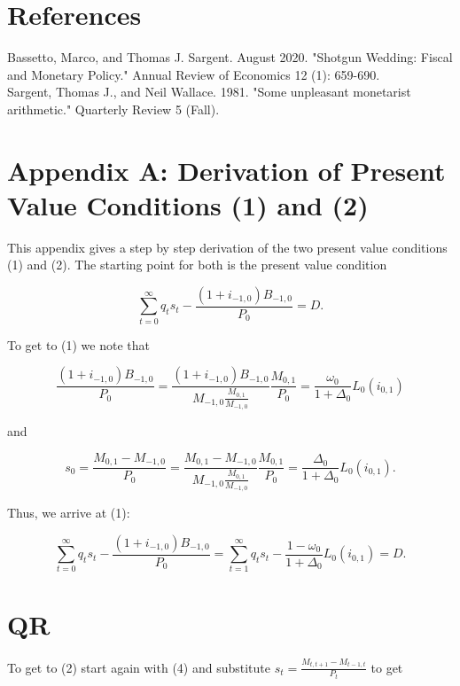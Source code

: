\documentclass[10pt]{article}
\begin{document}
\section*{References}
Bassetto, Marco, and Thomas J. Sargent. August 2020. "Shotgun Wedding: Fiscal and Monetary Policy." Annual Review of Economics 12 (1): 659-690.\\
Sargent, Thomas J., and Neil Wallace. 1981. "Some unpleasant monetarist arithmetic." Quarterly Review 5 (Fall).

\section*{Appendix A: Derivation of Present Value Conditions (1) and (2)}
This appendix gives a step by step derivation of the two present value conditions (1) and (2). The starting point for both is the present value condition

\begin{equation*}
\sum_{t=0}^{\infty} q_{t} s_{t}-\frac{\left(1+i_{-1,0}\right) B_{-1,0}}{P_{0}}=D . \tag{4}
\end{equation*}

To get to (1) we note that

\begin{equation*}
\frac{\left(1+i_{-1,0}\right) B_{-1,0}}{P_{0}}=\frac{\left(1+i_{-1,0}\right) B_{-1,0}}{M_{-1,0} \frac{M_{0,1}}{M_{-1,0}}} \frac{M_{0,1}}{P_{0}}=\frac{\omega_{0}}{1+\Delta_{0}} L_{0}\left(i_{0,1}\right)
\end{equation*}

and

\begin{equation*}
s_{0}=\frac{M_{0,1}-M_{-1,0}}{P_{0}}=\frac{M_{0,1}-M_{-1,0}}{M_{-1,0} \frac{M_{0,1}}{M_{-1,0}}} \frac{M_{0,1}}{P_{0}}=\frac{\Delta_{0}}{1+\Delta_{0}} L_{0}\left(i_{0,1}\right) .
\end{equation*}

Thus, we arrive at (1):

\begin{equation*}
\sum_{t=0}^{\infty} q_{t} s_{t}-\frac{\left(1+i_{-1,0}\right) B_{-1,0}}{P_{0}}=\sum_{t=1}^{\infty} q_{t} s_{t}-\frac{1-\omega_{0}}{1+\Delta_{0}} L_{0}\left(i_{0,1}\right)=D .
\end{equation*}

\section*{QR}
To get to (2) start again with (4) and substitute $s_{t}=\frac{M_{t, t+1}-M_{t-1, t}}{P_{t}}$ to get
\end{document}
